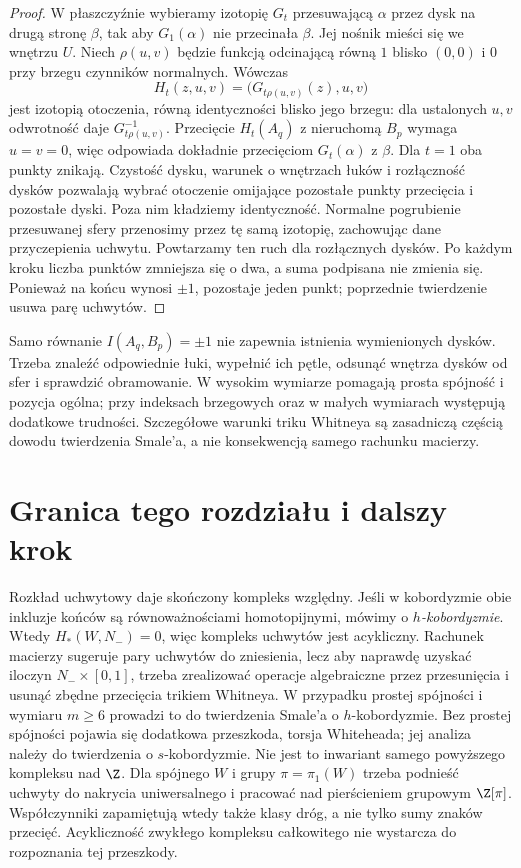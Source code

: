 \begin{proof}
W płaszczyźnie wybieramy izotopię $G_t$ przesuwającą $\alpha$
przez dysk na drugą stronę $\beta$, tak aby $G_1(\alpha)$
nie przecinała $\beta$. Jej nośnik mieści się we wnętrzu $U$.
Niech $\rho(u,v)$ będzie funkcją odcinającą równą $1$ blisko
$(0,0)$ i $0$ przy brzegu czynników normalnych. Wówczas
\[
 H_t(z,u,v)=\bigl(G_{t\rho(u,v)}(z),u,v\bigr)
\]
jest izotopią otoczenia, równą identyczności blisko jego brzegu:
dla ustalonych $u,v$ odwrotność daje $G_{t\rho(u,v)}^{-1}$.
Przecięcie $H_t(A_q)$ z nieruchomą $B_p$ wymaga $u=v=0$,
więc odpowiada dokładnie przecięciom $G_t(\alpha)$ z $\beta$.
Dla $t=1$ oba punkty znikają. Czystość dysku, warunek o wnętrzach
łuków i rozłączność dysków pozwalają wybrać otoczenie omijające
pozostałe punkty przecięcia i pozostałe dyski. Poza nim kładziemy
identyczność. Normalne pogrubienie przesuwanej sfery przenosimy
przez tę samą izotopię, zachowując dane przyczepienia uchwytu.
Powtarzamy ten ruch dla rozłącznych
dysków. Po każdym kroku liczba
punktów zmniejsza się o dwa, a
suma podpisana nie zmienia się.
Ponieważ na końcu wynosi $\pm1$,
pozostaje jeden punkt; poprzednie
twierdzenie usuwa parę uchwytów.
\end{proof}

\begin{uwaga}
Samo równanie $I(A_q,B_p)=\pm1$
nie zapewnia istnienia wymienionych
dysków. Trzeba znaleźć odpowiednie
łuki, wypełnić ich pętle, odsunąć
wnętrza dysków od sfer i sprawdzić
obramowanie. W wysokim wymiarze
pomagają prosta spójność i pozycja
ogólna; przy indeksach brzegowych
oraz w małych wymiarach występują
dodatkowe trudności. Szczegółowe
warunki triku Whitneya są zasadniczą
częścią dowodu twierdzenia Smale'a,
a nie konsekwencją samego rachunku
macierzy.
\end{uwaga}

\section{Granica tego rozdziału i dalszy krok}
\label{sec:uchwyty-smale-most-18}

Rozkład uchwytowy daje skończony
kompleks względny. Jeśli w kobordyzmie
obie inkluzje końców są równoważnościami
homotopijnymi, mówimy o
\emph{$h$-kobordyzmie}. Wtedy
$H_*(W,N_-)=0$, więc kompleks
uchwytów jest acykliczny.
Rachunek macierzy sugeruje pary
uchwytów do zniesienia, lecz
aby naprawdę uzyskać iloczyn
$N_-\times[0,1]$, trzeba
zrealizować operacje algebraiczne
przez przesunięcia i usunąć
zbędne przecięcia trikiem Whitneya.
W przypadku prostej spójności i
wymiaru $m\geq6$ prowadzi to do
twierdzenia Smale'a o $h$-kobordyzmie.
Bez prostej spójności pojawia się
dodatkowa przeszkoda, torsja
Whiteheada; jej analiza należy
do twierdzenia o $s$-kobordyzmie.
Nie jest to inwariant samego powyższego kompleksu nad $\Z$.
Dla spójnego $W$ i grupy $\pi=\pi_1(W)$ trzeba podnieść uchwyty
do nakrycia uniwersalnego i pracować nad pierścieniem
grupowym $\Z[\pi]$. Współczynniki zapamiętują wtedy
także klasy dróg, a nie tylko sumy znaków przecięć.
Acykliczność zwykłego kompleksu całkowitego
nie wystarcza do rozpoznania tej przeszkody.


